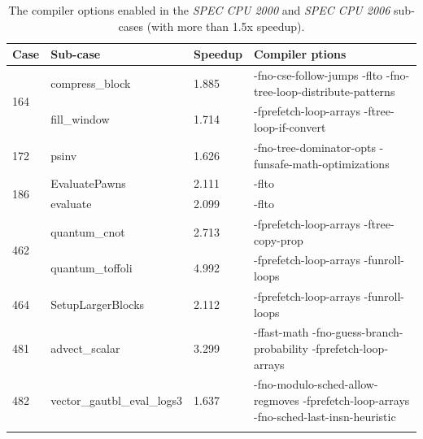 \documentclass[bst/sn-mathphys]{sn-jnl}%
\theoremstyle{thmstyleone}%
\theoremstyle{thmstyletwo}%
\theoremstyle{thmstylethree}%
\begin{document}
\begin{table}[h]
\begin{center}
\begin{minipage}{\textwidth}
\caption{The compiler options enabled in the \emph{SPEC CPU 2000} and 
	\emph{SPEC CPU 2006} sub-cases (with more than 1.5x speedup).}
	\label{TAB2}%
	\begin{tabular*}{\textwidth}{@{\extracolsep{\fill}}lllp{}@{\extracolsep{\fill}}}
\toprule%
Case		     & Sub-case			   & Speedup	& Compiler ptions\\
\midrule
\multirow{2}{*}{164} & compress\_block             & 1.885 	& -fno-cse-follow-jumps -flto -fno-tree-loop-distribute-patterns                         \\
                     & fill\_window                & 1.714 	& -fprefetch-loop-arrays -ftree-loop-if-convert                                          \\
172                  & psinv                       & 1.626 	& -fno-tree-dominator-opts -funsafe-math-optimizations                                   \\
\multirow{2}{*}{186} & EvaluatePawns               & 2.111 	& -flto                                                                                  \\
                     & evaluate                    & 2.099 	& -flto                                                                                  \\
\multirow{2}{*}{462} & quantum\_cnot               & 2.713 	& -fprefetch-loop-arrays -ftree-copy-prop                                                \\
                     & quantum\_toffoli            & 4.992 	& -fprefetch-loop-arrays -funroll-loops                                                  \\
464                  & SetupLargerBlocks           & 2.112 	& -fprefetch-loop-arrays -funroll-loops                                                  \\
481                  & advect\_scalar              & 3.299 	& -ffast-math -fno-guess-branch-probability -fprefetch-loop-arrays                       \\
482                  & vector\_gautbl\_eval\_logs3 & 1.637 	& -fno-modulo-sched-allow-regmoves -fprefetch-loop-arrays -fno-sched-last-insn-heuristic \\
\botrule
\end{tabular*}
\end{minipage}
\end{center}
\end{table}
\end{document}
